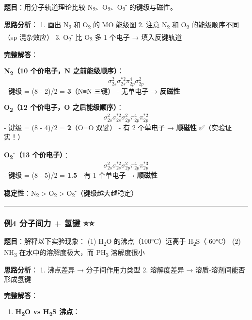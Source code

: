 \documentclass[a4paper,11pt]{ctexart}
\providecommand{\tightlist}{\setlength{\itemsep}{0pt}\setlength{\parskip}{0pt}}
\begin{document}
\textbf{题目}：用分子轨道理论比较 N\textsubscript{2}、O\textsubscript{2}、O\textsubscript{2}\textsuperscript{-} 的键级与磁性。

\textbf{思路分析}：
1. 画出 N\textsubscript{2} 和 O\textsubscript{2} 的 MO 能级图
2. 注意 N\textsubscript{2} 和 O\textsubscript{2} 的能级顺序不同（sp 混杂效应）
3. O\textsubscript{2}\textsuperscript{-} 比 O\textsubscript{2} 多 1 个电子 → 填入反键轨道

\textbf{完整解答}：

\textbf{N\textsubscript{2}（10 个价电子，N 之前能级顺序）}：
\[
\sigma_{2s}^2 \sigma_{2s}^{*2} \pi_{2p}^4 \sigma_{2p}^2
\]
- 键级 = (8 - 2)/2 = \textbf{3}（N≡N 三键）
- 无单电子 → \textbf{反磁性}

\textbf{O\textsubscript{2}（12 个价电子，O 之后能级顺序）}：
\[
\sigma_{2s}^2 \sigma_{2s}^{*2} \sigma_{2p}^2 \pi_{2p}^4 \pi_{2p}^{*2}
\]
- 键级 = (8 - 4)/2 = \textbf{2}（O=O 双键）
- 有 2 个单电子 → \textbf{顺磁性} ✅（实验证实！）

\textbf{O\textsubscript{2}\textsuperscript{-}（13 个价电子）}：
\[
\sigma_{2s}^2 \sigma_{2s}^{*2} \sigma_{2p}^2 \pi_{2p}^4 \pi_{2p}^{*3}
\]
- 键级 = (8 - 5)/2 = \textbf{1.5}
- 有 1 个单电子 → \textbf{顺磁性}

\textbf{稳定性}：N\textsubscript{2} \textgreater{} O\textsubscript{2} \textgreater{} O\textsubscript{2}\textsuperscript{-}（键级越大越稳定）

\begin{center}\rule{0.5\linewidth}{0.5pt}\end{center}

\subsubsection{例4 分子间力 + 氢键 ⭐⭐}\label{ux4f8b4-ux5206ux5b50ux95f4ux529b-ux6c22ux952e}

\textbf{题目}：解释以下实验现象：
(1) H\textsubscript{2}O 的沸点（100°C）远高于 H\textsubscript{2}S（-60°C）
(2) NH\textsubscript{3} 在水中的溶解度极大，而 PH\textsubscript{3} 溶解度很小

\textbf{思路分析}：
1. 沸点差异 → 分子间作用力类型
2. 溶解度差异 → 溶质-溶剂间能否形成氢键

\textbf{完整解答}：

\begin{enumerate}
\def\labelenumi{(\arabic{enumi})}
\tightlist
\item
  \textbf{H\textsubscript{2}O vs H\textsubscript{2}S 沸点}：
\end{enumerate}
\end{document}

